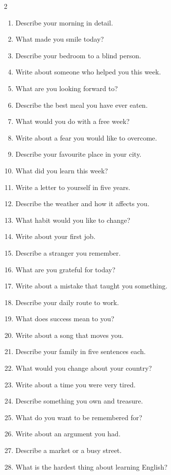 \begin{tableau}
\footnotesize
\begin{multicols}{2}
\begin{anglais}
\begin{enumerate}\setlength{\itemsep}{1pt}
\item Describe your morning in detail.
\item What made you smile today?
\item Describe your bedroom to a blind person.
\item Write about someone who helped you this week.
\item What are you looking forward to?
\item Describe the best meal you have ever eaten.
\item What would you do with a free week?
\item Write about a fear you would like to overcome.
\item Describe your favourite place in your city.
\item What did you learn this week?
\item Write a letter to yourself in five years.
\item Describe the weather and how it affects you.
\item What habit would you like to change?
\item Write about your first job.
\item Describe a stranger you remember.
\item What are you grateful for today?
\item Write about a mistake that taught you something.
\item Describe your daily route to work.
\item What does success mean to you?
\item Write about a song that moves you.
\item Describe your family in five sentences each.
\item What would you change about your country?
\item Write about a time you were very tired.
\item Describe something you own and treasure.
\item What do you want to be remembered for?
\item Write about an argument you had.
\item Describe a market or a busy street.
\item What is the hardest thing about learning English?

\end{enumerate}
\end{anglais}
\end{multicols}
\end{tableau}
